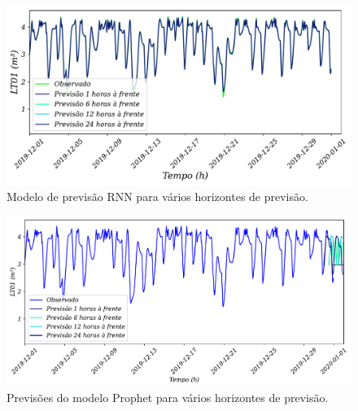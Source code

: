 \begin{figure}[!htb]
	\centering
	\caption{Modelo de previsão RNN para vários horizontes de previsão.}
	\label{fig:rnn}
	\includegraphics[width=0.7\linewidth]{Resultados/Figuras/RNN}
\end{figure}
\begin{figure}[!htb]
	\centering
	\caption{Previsões do modelo Prophet para vários horizontes de previsão.}\label{fig:prophet1}
	\includegraphics[width=0.7\linewidth]{Resultados/Figuras/prophet}	
\end{figure}





